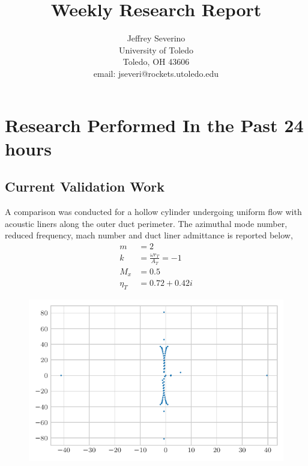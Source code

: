 \documentclass[a4paper]{article}
\begin{document}
\begin{titlepage}

    \title{
    Weekly Research Report}


    \author{ Jeffrey Severino \\
        University of Toledo \\
        Toledo, OH  43606 \\
    email: jseveri@rockets.utoledo.edu}


    \maketitle

\end{titlepage}

\section{Research Performed In the Past 24 hours}
\subsection{Current Validation Work}

A comparison was conducted for a hollow cylinder undergoing uniform flow with
acoustic liners along the outer duct perimeter. The azimuthal mode number, reduced 
frequency, mach number and duct liner admittance is reported below,
\begin{align*}
    m &= 2 \\
    k &= \frac{\omega r_T}{A_T} = -1 \\
    M_x &= 0.5 \\
    \eta_T &= 0.72 + 0.42i
\end{align*} 
\begin{figure}[h!]
    \centering
    \includegraphics[width=\textwidth]{../../tex-outputs/gam.acc.scatter.Table4.3.pdf}
\end{figure}
\end{document}
